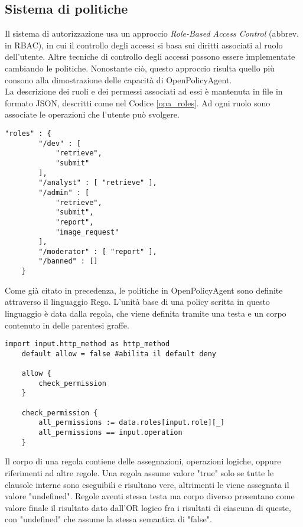 \subsection{Sistema di politiche}
Il sistema di autorizzazione usa un approccio \textit{Role-Based Access Control} (abbrev. in RBAC), in cui il 
controllo degli accessi si basa sui diritti associati al ruolo dell'utente. 
Altre tecniche di controllo degli accessi possono essere implementate cambiando le politiche. Nonostante ciò, 
questo approccio risulta quello più consono alla dimostrazione delle capacità di OpenPolicyAgent.
\\ La descrizione dei ruoli e dei permessi associati ad essi è mantenuta in file in formato JSON, descritti come nel Codice \ref*{opa_roles}.
Ad ogni ruolo sono associate le operazioni che l'utente può svolgere.
\lstset{language=nginx}
\begin{lstlisting}[caption={Descrizione dei ruoli},captionpos=b,label=opa_roles]
    "roles" : {
        "/dev" : [
            "retrieve", 
            "submit"
        ],
        "/analyst" : [ "retrieve" ],
        "/admin" : [ 
            "retrieve", 
            "submit",
            "report",
            "image_request"
        ],
        "/moderator" : [ "report" ], 
        "/banned" : []
    }
\end{lstlisting}
Come già citato in precedenza, le politiche in OpenPolicyAgent sono definite attraverso il linguaggio Rego. L'unità base di una policy scritta in questo linguaggio è data 
dalla regola, che viene definita tramite una testa e un corpo contenuto in delle parentesi graffe. 
\begin{lstlisting}[caption={Policy in linguaggio Rego},captionpos=b,label=opa_policy]
    import input.http_method as http_method   
    default allow = false #abilita il default deny

    allow {
        check_permission
    }

    check_permission {
        all_permissions := data.roles[input.role][_]
        all_permissions == input.operation
    }
\end{lstlisting}
Il corpo di una regola contiene delle assegnazioni, operazioni logiche, oppure riferimenti ad altre regole. Una regola assume valore "true" 
solo se tutte le clausole interne sono eseguibili e risultano vere, altrimenti le viene assegnata il valore "undefined". Regole aventi stessa testa ma corpo diverso presentano come valore finale 
il risultato dato dall'OR logico fra i risultati di ciascuna di queste, con "undefined" che assume la stessa semantica di "false". 
